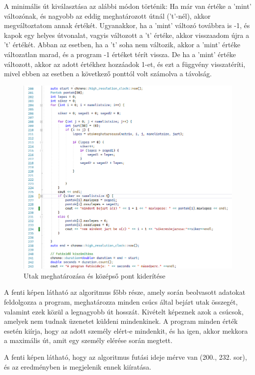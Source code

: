 A minimális út kiválasztása az alábbi módon történik: Ha már van értéke a 'mint' változónak, és nagyobb az eddig meghatározott útnál ('t'-nél), akkor megváltoztatom annak értékét. Ugyanakkor, ha a 'mint' változó továbbra is -1, és kapok egy helyes útvonalat, vagyis változott a 't' értéke, akkor visszaadom újra a 't' értékét. Abban az esetben, ha a 't' soha nem változik, akkor a 'mint' értéke változatlan marad, és a program -1 értéket térít vissza. De ha a 'mint' értéke változott, akkor az adott értékhez hozzáadok 1-et, és ezt a függvény visszatéríti, mivel ebben az esetben a következő ponttól volt számolva a távolság.

\newpage
\begin{figure}[h]
	\centering
	\includegraphics[scale=0.6]{images/kozeppont}
	\caption{Utak meghatározása és középső pont kiderítése}
\end{figure}

A fenti képen látható az algoritmus főbb része, amely során beolvasott adatokat feldolgozza a program, meghatározza minden csúcs által bejárt utak összegét, valamint ezek közül a legnagyobb út hosszát. Kivételt képeznek azok a csúcsok, amelyek nem tudnak üzenetet küldeni mindenkinek. A program minden érték esetén kiírja, hogy az adott személy elért-e mindenkit, és ha igen, akkor mekkora a maximális út, amit egy személy elérése során megtett.

A fenti képen látható, hogy az algoritmus futási ideje mérve van (200., 232. sor), és az eredményben is megjelenik ennek kiíratása.

